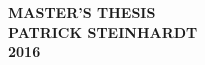 \documentclass[a4paper]{article}
\begin{document}
        \thispagestyle{empty}

        \begin{center}
                \vspace*{4cm}
                {\Huge\bfseries MASTER'S THESIS}\\
                \vspace*{2.5cm}
                {\LARGE\bfseries PATRICK STEINHARDT}\\
                \vspace*{1.0cm}
                {\LARGE\bfseries 2016}
        \end{center}
\end{document}
